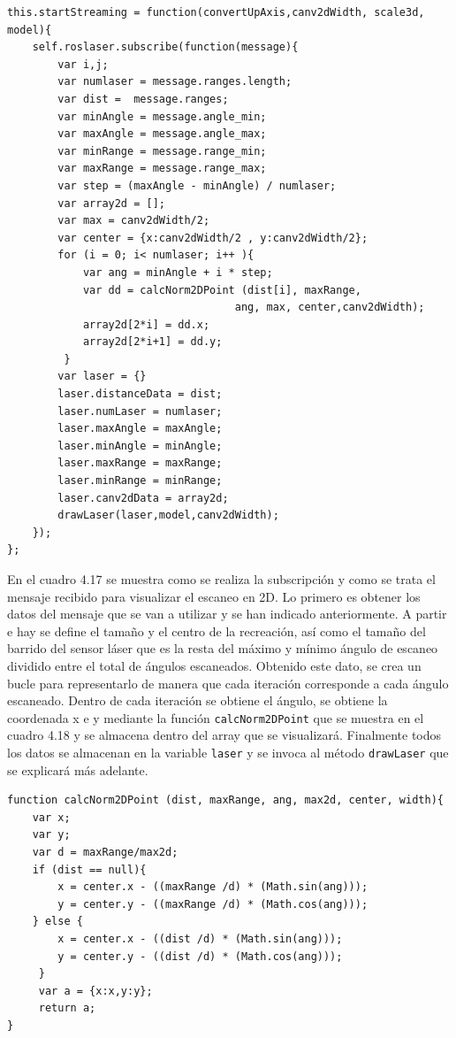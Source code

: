 \begin{lstlisting}[caption= Subscripción y tratamiento del mensaje para su visualización en 2D, label=cod.subslaser2D]
this.startStreaming = function(convertUpAxis,canv2dWidth, scale3d, model){
	self.roslaser.subscribe(function(message){
		var i,j;
		var numlaser = message.ranges.length;
		var dist =  message.ranges;
		var minAngle = message.angle_min;
		var maxAngle = message.angle_max;
		var minRange = message.range_min;
		var maxRange = message.range_max;
		var step = (maxAngle - minAngle) / numlaser;
		var array2d = [];
		var max = canv2dWidth/2;
		var center = {x:canv2dWidth/2 , y:canv2dWidth/2};
		for (i = 0; i< numlaser; i++ ){
			var ang = minAngle + i * step;
			var dd = calcNorm2DPoint (dist[i], maxRange, 
									ang, max, center,canv2dWidth);
			array2d[2*i] = dd.x;
			array2d[2*i+1] = dd.y;
		 }
		var laser = {}
		laser.distanceData = dist;
		laser.numLaser = numlaser;
		laser.maxAngle = maxAngle;
		laser.minAngle = minAngle;
		laser.maxRange = maxRange;
		laser.minRange = minRange;
		laser.canv2dData = array2d;
		drawLaser(laser,model,canv2dWidth);
	});
};
\end{lstlisting}

En el cuadro 4.17 se muestra como se realiza la subscripción y como se trata el mensaje recibido para visualizar el escaneo en 2D. Lo primero es obtener los datos del mensaje que se van a utilizar y se han indicado anteriormente. A partir e hay se define el tamaño y el centro de la recreación, así como el tamaño del barrido del sensor láser que es la resta del máximo y mínimo ángulo de escaneo dividido entre el total de ángulos escaneados. Obtenido este dato, se crea un bucle para representarlo de manera que cada iteración corresponde a cada ángulo escaneado. Dentro de cada iteración se obtiene el ángulo, se obtiene la coordenada x e y mediante la función \texttt{calcNorm2DPoint} que se muestra en el cuadro 4.18 y se almacena dentro del array que se visualizará. Finalmente todos los datos se almacenan en la variable \texttt{laser} y se invoca al método \texttt{drawLaser} que se explicará más adelante.

\begin{lstlisting}[caption= Calcular las coordenadas 2D, label=cod.lasercoor2d]
function calcNorm2DPoint (dist, maxRange, ang, max2d, center, width){
	var x;
	var y;
	var d = maxRange/max2d;
	if (dist == null){
		x = center.x - ((maxRange /d) * (Math.sin(ang)));
		y = center.y - ((maxRange /d) * (Math.cos(ang)));
	} else {
		x = center.x - ((dist /d) * (Math.sin(ang)));
		y = center.y - ((dist /d) * (Math.cos(ang)));
	 }
	 var a = {x:x,y:y};
	 return a;
}
\end{lstlisting}

